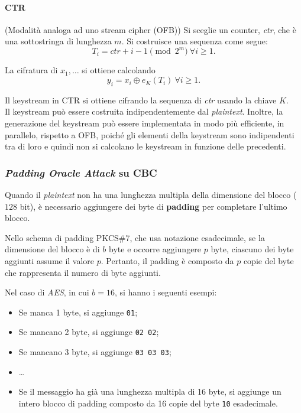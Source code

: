 \paragraph{CTR} (Modalità analoga ad uno stream cipher (OFB)) Si sceglie un counter, \textit{ctr}, che è una sottostringa di lunghezza $m$. Si costruisce una sequenza come segue: 
\[
T_i=ctr+i-1 \pmod 2^m \ \forall i\geq 1.
\]

\noindent La cifratura di $x_1,\dots$ si ottiene calcolando
\[
y_i=x_i \oplus e_K(T_i) \ \forall i \geq 1. 
\]

\noindent Il keystream in CTR si ottiene cifrando la sequenza di \textit{ctr} usando la chiave $K$. \\ Il keystream può essere costruita indipendentemente dal \textit{plaintext}. Inoltre, la generazione del keystream può essere implementata in modo più efficiente, in parallelo, rispetto a OFB, poiché gli elementi della keystream sono indipendenti tra di loro e quindi non si calcolano le keystream in funzione delle precedenti.

\subsubsection{\textit{Padding Oracle Attack} su CBC}
Quando il \textit{plaintext} non ha una lunghezza multipla della dimensione del blocco ($128$ bit), è necessario aggiungere dei byte di \textbf{padding} per completare l'ultimo blocco.

\vspace{1em} \noindent Nello schema di padding PKCS\#7, che usa notazione esadecimale, se la dimensione del blocco è di $b$ byte
e occorre aggiungere $p$ byte, ciascuno dei byte aggiunti assume il valore $p$. Pertanto, il padding è composto da $p$ copie del byte che rappresenta il numero di byte aggiunti.

\vspace{1em}\noindent Nel caso di \textit{AES}, in cui $b=16$, si hanno i seguenti esempi:

\begin{itemize}
    \item Se manca 1 byte, si aggiunge \texttt{01};
    \item Se mancano 2 byte, si aggiunge \texttt{02 02};
    \item Se mancano 3 byte, si aggiunge
    \texttt{03 03 03};
    \item \dots
    \item Se il messaggio ha già una lunghezza multipla di 16 byte,
    si aggiunge un intero blocco di padding composto da 16 copie
    del byte \texttt{10} esadecimale.
\end{itemize}

